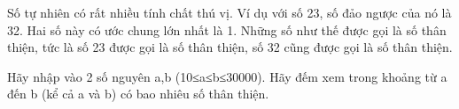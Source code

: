 Số tự nhiên có rất nhiều tính chất thú vị. Ví dụ với số 23, số đảo ngược của nó là 32. Hai số này có ước chung lớn nhất là 1. Những số như thế được gọi là số thân thiện, tức là số 23 được gọi là số thân thiện, số 32 cũng được gọi là số thân thiện.  

   Hãy nhập vào 2 số nguyên a,b (10≤a≤b≤30000). Hãy đếm xem trong khoảng từ a đến b (kể  cả a và b) có bao nhiêu số thân thiện.  

\